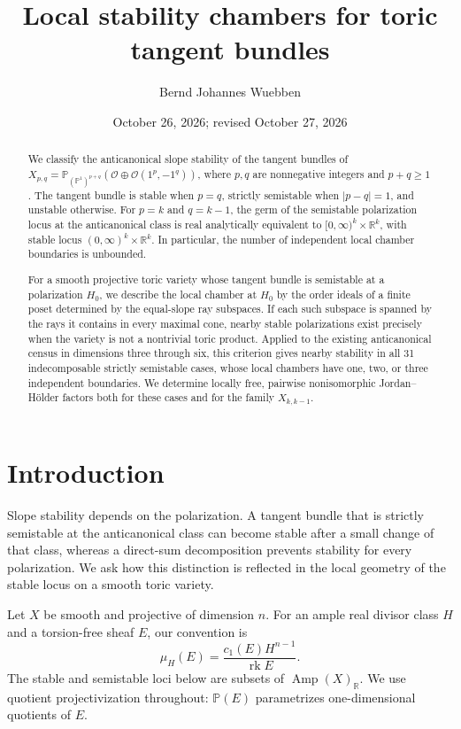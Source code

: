 \documentclass[11pt]{amsart}
\title{Local stability chambers for toric tangent bundles}
\author{Bernd Johannes Wuebben}
\date{October 26, 2026; revised October 27, 2026}
\theoremstyle{definition}
\theoremstyle{remark}
\newcommand{\PP}{\mathbb P}
\newcommand{\RR}{\mathbb R}
\newcommand{\Amp}{\operatorname{Amp}}
\newcommand{\rk}{\operatorname{rk}}
\begin{document}
\begin{abstract}
We classify the anticanonical slope stability of the tangent bundles of
$X_{p,q}=\PP_{(\PP^1)^{p+q}}(\mathcal O\oplus\mathcal O(1^p,-1^q))$,
where $p,q$ are nonnegative integers and $p+q\ge1$. The tangent bundle is stable when
$p=q$, strictly semistable when $|p-q|=1$, and unstable otherwise.
For $p=k$ and $q=k-1$, the germ of the semistable polarization locus at
the anticanonical class is real analytically equivalent to
$[0,\infty)^k\times\RR^k$, with stable locus
$(0,\infty)^k\times\RR^k$. In particular, the number of independent
local chamber boundaries is unbounded.

For a smooth projective toric variety whose tangent bundle is semistable
at a polarization $H_0$, we describe the local chamber at $H_0$ by the order ideals of a finite poset
determined by the equal-slope ray subspaces. If each such subspace is
spanned by the rays it contains in every maximal cone, nearby stable
polarizations exist precisely when the variety is not a nontrivial
toric product. Applied to the existing anticanonical census in dimensions
three through six, this criterion gives nearby stability in all 31
indecomposable strictly semistable cases, whose local chambers have
one, two, or three independent boundaries. We determine locally free,
pairwise nonisomorphic Jordan--H\"older factors both for these cases and
for the family $X_{k,k-1}$.
\end{abstract}
\maketitle

\section{Introduction}

Slope stability depends on the polarization. A tangent bundle that is
strictly semistable at the anticanonical class can become stable after a
small change of that class, whereas a direct-sum decomposition prevents
stability for every polarization. We ask how this distinction is
reflected in the local geometry of the stable locus on a smooth toric
variety.

Let $X$ be smooth and projective of dimension $n$. For an ample real
divisor class $H$ and a torsion-free sheaf $E$, our convention is
\[
 \mu_H(E)=\frac{c_1(E)H^{n-1}}{\rk E}.
\]
The stable and semistable loci below are subsets of $\Amp(X)_\RR$.
We use quotient projectivization throughout: $\PP(E)$ parametrizes
one-dimensional quotients of $E$.
\end{document}
